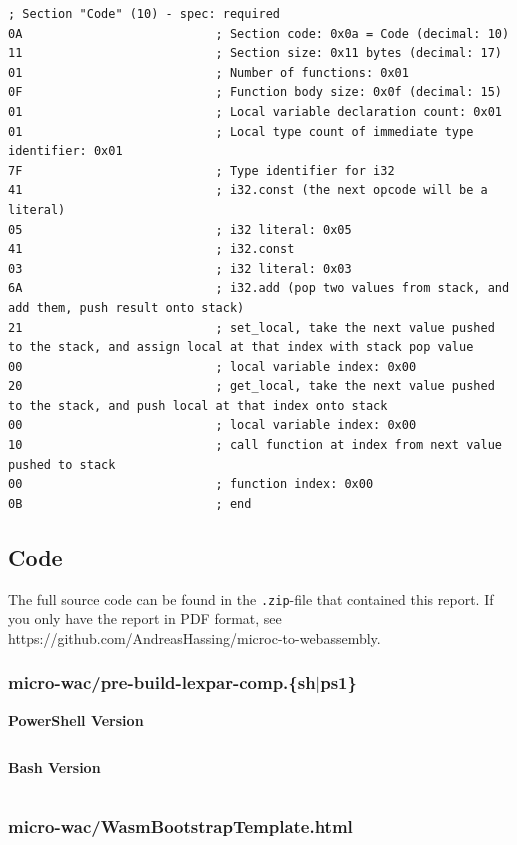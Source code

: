 \documentclass[a4paper]{article}
\begin{document}
\begin{verbatim}
; Section "Code" (10) - spec: required
0A                           ; Section code: 0x0a = Code (decimal: 10)
11                           ; Section size: 0x11 bytes (decimal: 17)
01                           ; Number of functions: 0x01
0F                           ; Function body size: 0x0f (decimal: 15)
01                           ; Local variable declaration count: 0x01
01                           ; Local type count of immediate type identifier: 0x01
7F                           ; Type identifier for i32
41                           ; i32.const (the next opcode will be a literal)
05                           ; i32 literal: 0x05
41                           ; i32.const
03                           ; i32 literal: 0x03
6A                           ; i32.add (pop two values from stack, and add them, push result onto stack)
21                           ; set_local, take the next value pushed to the stack, and assign local at that index with stack pop value
00                           ; local variable index: 0x00
20                           ; get_local, take the next value pushed to the stack, and push local at that index onto stack
00                           ; local variable index: 0x00
10                           ; call function at index from next value pushed to stack
00                           ; function index: 0x00
0B                           ; end
\end{verbatim}

\newpage
\subsection{Code}
\label{sec:appendix:code}
The full source code can be found in the \texttt{.zip}-file that contained this report. If you only have the report in PDF format, see https://github.com/AndreasHassing/microc-to-webassembly.

\subsubsection{micro-wac/pre-build-lexpar-comp.\{sh$|$ps1\}}
\label{sec:appendix:code:pre-build-lexpar-comp}
\textbf{PowerShell Version}
\inputminted[breaklines,tabsize=2,linenos]{powershell}{../micro-wac/pre-build-lexpar-comp.ps1}

\newpage
\noindent\textbf{Bash Version}
\inputminted[breaklines,tabsize=2,linenos]{bash}{../micro-wac/pre-build-lexpar-comp.sh}

\newpage
\subsubsection{micro-wac/WasmBootstrapTemplate.html}
\label{sec:appendix:code:bootstrap-template}
\inputminted[breaklines,tabsize=2,linenos]{html}{../micro-wac/WasmBootstrapTemplate.html}
\end{document}
